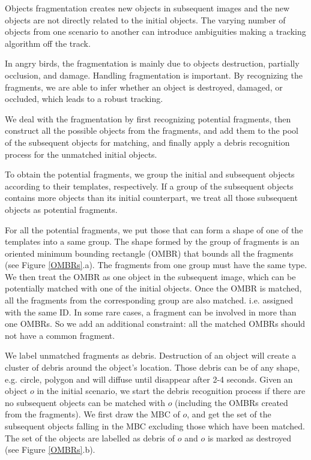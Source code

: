 \documentclass[letterpaper]{article}
\begin{document}
Objects fragmentation creates new objects in subsequent images and the new objects are not directly related to the initial objects. The varying number of objects from one scenario to another can introduce ambiguities making a tracking algorithm off the track. 

In angry birds, the fragmentation is mainly due to objects destruction, partially occlusion, and damage. Handling fragmentation is important. By recognizing the fragments, we are able to infer whether an object is destroyed, damaged, or occluded, which leads to a robust tracking.

We deal with the fragmentation by first recognizing potential fragments, then construct all the possible objects from the fragments, and add them to the pool of the subsequent objects for matching, and finally apply a debris recognition process for the unmatched initial objects. 

To obtain the potential fragments, we group the initial and subsequent objects according to their templates, respectively. If a group of the subsequent objects contains more objects than its initial counterpart, we treat all those subsequent objects as potential fragments.  

For all the potential fragments, we put those that can form a shape of one of the templates into a same group. The shape formed by the group of fragments is an oriented minimum bounding rectangle (OMBR) that bounds all the fragments (see Figure \ref{OMBRs}.a). The fragments from one group must have the same type. We then treat the OMBR as one object in the subsequent image, which can be potentially matched with one of the initial objects. Once the OMBR is matched, all the fragments from the corresponding group are also matched. i.e. assigned with the same ID. In some rare cases, a fragment can be involved in more than one OMBRs. So we add an additional constraint: all the matched OMBRs should not have a common fragment. 

We label unmatched fragments as debris. Destruction of an object will create a cluster of debris around the object's location. Those debris can be of any shape, e.g. circle, polygon and will diffuse until disappear after 2-4 seconds. Given an object $o$ in the initial scenario, we start the debris recognition process if there are no subsequent objects can be matched with $o$ (including the OMBRs created from the fragments). We first draw the MBC of $o$, and get the set of the subsequent objects falling in the MBC excluding those which have been matched. The set of the objects are labelled as debris of $o$ and $o$ is marked as destroyed (see Figure \ref{OMBRs}.b). 
\end{document}
